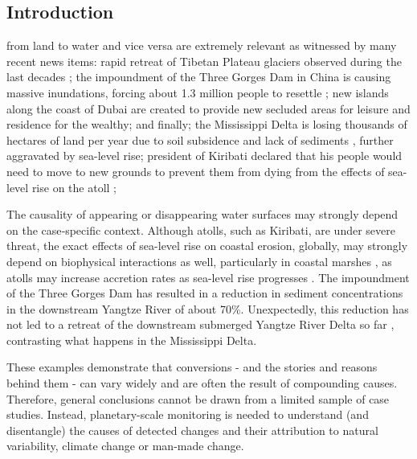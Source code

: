 \subsection{Introduction}
 from land to water and vice versa are extremely relevant as witnessed by many recent news items: rapid retreat of Tibetan Plateau glaciers observed during the last decades \citet{chen2016changes}; the impoundment of the Three Gorges Dam in China is causing massive inundations, forcing about 1.3 million people to resettle \citet{Jackson2000}; new islands along the coast of Dubai are created to provide new secluded areas for leisure and residence for the wealthy; and finally; the Mississippi Delta is losing thousands of hectares of land per year due to soil subsidence and lack of sediments \citet{Giosan2014}, further aggravated by sea-level rise; president of Kiribati declared that his people would need to move to new grounds to prevent them from dying from the effects of sea-level rise on the atoll \citet{Weiss2015}; 

The causality of appearing or disappearing water surfaces may strongly depend on the case‑specific context. Although atolls, such as Kiribati, are under severe threat, the exact effects of sea-level rise on coastal erosion, globally, may strongly depend on biophysical interactions as well, particularly in coastal marshes \citet{Storlazzi2015}, as atolls may increase accretion rates as sea-level rise progresses \citet{Kirwan2016}. The impoundment of the Three Gorges Dam has resulted in a reduction in sediment concentrations in the downstream Yangtze River of about 70\%. Unexpectedly, this reduction has not led to a retreat of the downstream submerged Yangtze River Delta so far \citet{Dai2014}, contrasting what happens in the Mississippi Delta.

These examples demonstrate that conversions - and the stories and reasons behind them - can vary widely and are often the result of compounding causes. Therefore, general conclusions cannot be drawn from a limited sample of case studies. Instead, planetary-scale monitoring is needed to understand (and disentangle) the causes of detected changes and their attribution to natural variability, climate change or man-made change. 

